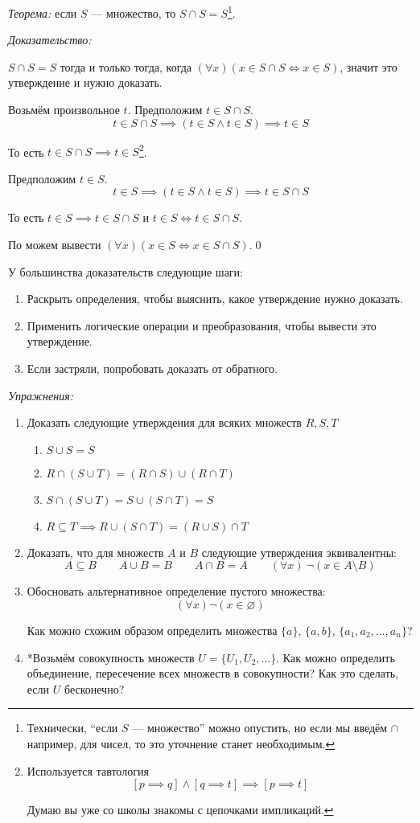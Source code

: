 {\it Теорема:} если $S$ --- множество, то $S\cap S=S$\footnote{
	Технически, ``если $S$ --- множество'' можно опустить, но если
	мы введём $\cap$ например, для чисел, то это уточнение станет необходимым.
}.

{\it Доказательство:}

$S\cap S=S$ тогда и только
тогда, когда ${(\forall x)(x\in S\cap S\iff x\in S)}$,
значит это утверждение и нужно доказать.

Возьмём произвольное $t$. Предположим $t\in S\cap S$.
\[
	t\in S\cap S\implies (t\in S\land t\in S)\implies t\in S
\]

То есть $t\in S\cap S\implies t\in S$\footnote{Используется
	тавтология
	\[
		[p\implies q]\land[q\implies t]\implies [p\implies t]
	\]

	Думаю вы уже со школы знакомы с цепочками импликаций.
}.

Предположим $t\in S$.
\[
	t\in S\implies (t\in S\land t\in S)\implies t\in S\cap S
\]

То есть $t\in S\implies t\in S\cap S$ и $t\in S\iff t\in S\cap S$.

По \Aii{} можем вывести $(\forall x)(x\in S\iff x\in S\cap S)$.\qed

\pagebreak

У большинства доказательств следующие шаги:
\begin{enumerate}
	\item{}Раскрыть определения, чтобы выяснить, какое утверждение нужно доказать.
	\item{}Применить логические операции и преобразования, чтобы вывести это утверждение.
	\item{}Если застряли, попробовать доказать от обратного.
\end{enumerate}

{\it Упражнения:}
\begin{enumerate}
	\item{}Доказать следующие утверждения для всяких множеств $R,S,T$
	\begin{enumerate}
		\item{}$S\cup S=S$
		\item{}$R\cap (S\cup T)=(R\cap S)\cup (R\cap T)$
		\item{}$S\cap (S\cup T)=S\cup (S\cap T)=S$
		\item{}$R\subseteq T\implies R\cup (S\cap T)=(R\cup S)\cap T$
	\end{enumerate}

	\item{}Доказать, что для множеств $A$ и $B$ следующие утверждения эквивалентны:
	\[
		A\subseteq B\qquad A\cup B=B\qquad A\cap B=A
		\qquad (\forall x)~\lnot(x\in A\setminus B)
	\]
	\item{}Обосновать альтернативное определение пустого множества:
	\[
		(\forall x)\lnot(x\in \varnothing)
	\]

	Как можно схожим образом определить множества $\{a\}$, $\{a,b\}$,
	$\{a_1,a_2,...,a_{n}\}$?
	\item{}*Возьмём совокупность множеств $U=\{U_{1},U_{2},...\}$.
	Как можно определить объединение, пересечение всех множеств в совокупности?
	Как это сделать, если $U$ бесконечно?
\end{enumerate}


